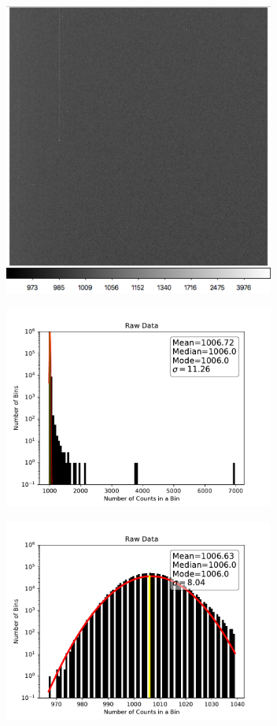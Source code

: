 \documentclass[preprint]{aastex62}
\begin{document}
        \begin{figure}
          \centering
            \includegraphics[width=3.5in]{../images/3p1_p10_00000000_BIAS.png}
            \caption{}
          \label{fig:p10BIASfits}
        \end{figure}
        \begin{figure}
          \centering
            \includegraphics[width=3.5in]{../images/pos10BIAS_raw.pdf}
            \caption{}
          \label{fig:pos10BIAShisto}
        \end{figure}
        \begin{figure}
          \centering
            \includegraphics[width=3.5in]{../images/pos10BIAS_clipped.pdf}
            \caption{}
          \label{fig:pos10BIAShisto_clipped}
        \end{figure}
    
\end{document}
